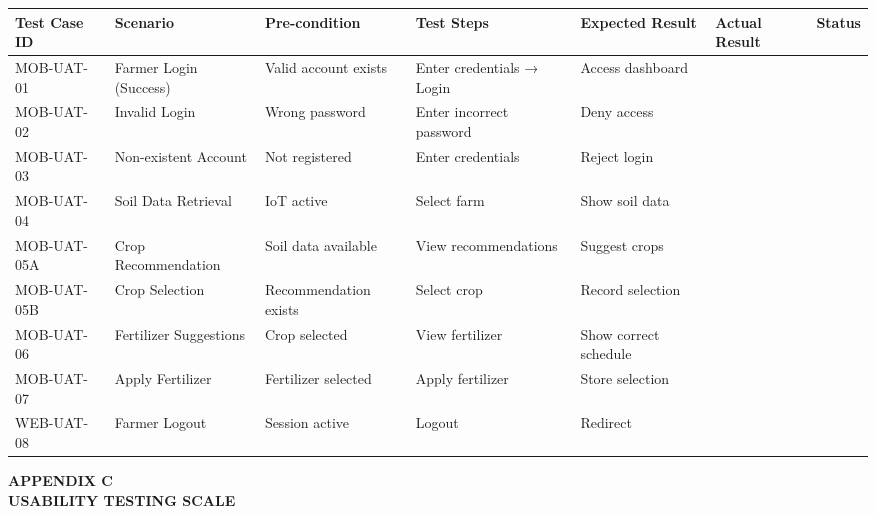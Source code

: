 {\begin{table}[H]
		\begin{adjustbox}{max width=\textwidth}
			\begin{tabular}{p{2cm}p{3cm}p{3cm}p{3cm}p{4cm}p{4cm}p{1.5cm}}
				\toprule
				\textbf{Test Case ID} & \textbf{Scenario} & \textbf{Pre-condition} & \textbf{Test Steps} & \textbf{Expected Result} & \textbf{Actual Result} & \textbf{Status} \\
				\midrule
				MOB-UAT-01 & Farmer Login (Success) & Valid account exists & Enter credentials → Login & Access dashboard & & \\
				MOB-UAT-02 & Invalid Login & Wrong password & Enter incorrect password & Deny access & & \\
				MOB-UAT-03 & Non-existent Account & Not registered & Enter credentials & Reject login & & \\
				MOB-UAT-04 & Soil Data Retrieval & IoT active & Select farm & Show soil data & & \\
				MOB-UAT-05A & Crop Recommendation & Soil data available & View recommendations & Suggest crops & & \\
				MOB-UAT-05B & Crop Selection & Recommendation exists & Select crop & Record selection & & \\
				MOB-UAT-06 & Fertilizer Suggestions & Crop selected & View fertilizer & Show correct schedule & & \\
				MOB-UAT-07 & Apply Fertilizer & Fertilizer selected & Apply fertilizer & Store selection & & \\
				WEB-UAT-08 & Farmer Logout & Session active & Logout & Redirect & & \\
				\bottomrule
			\end{tabular}
		\end{adjustbox}
	\end{table}
	
	\newpage
	
	\textbf{APPENDIX C}\\[1em]
	\textbf{USABILITY TESTING SCALE}
	
}
